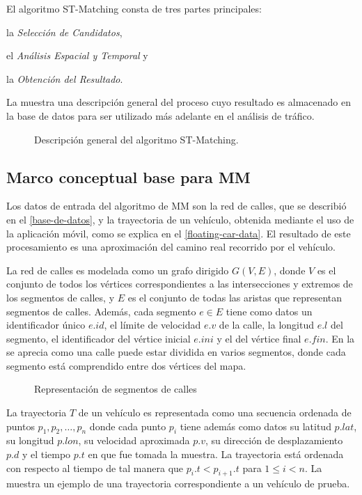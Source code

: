 El algoritmo ST-Matching consta de tres partes principales: \begin{enumerate*}[a)]
\item la \emph{Selección de Candidatos},
\item el \emph{Análisis Espacial y Temporal} y
\item la \emph{Obtención del Resultado}.
\end{enumerate*}
La  muestra una descripción general del proceso cuyo resultado es almacenado en la base de datos para ser utilizado más adelante en el análisis de tráfico.

\begin{figure}[h]
	\centering
	
	\caption[Descripción general de ST-Matching]{Descripción general del algoritmo ST-Matching.}
	\label{fig:st-matching} 
\end{figure}

\subsection{Marco conceptual base para MM}

Los datos de entrada del algoritmo de MM son la red de calles, que se describió en el \cref{base-de-datos}, y la trayectoria de un vehículo, obtenida mediante el uso de la aplicación móvil, como se explica en el \cref{floating-car-data}. El resultado de este procesamiento es una aproximación del camino real recorrido por el vehículo.

La red de calles es modelada como un grafo dirigido $G(V,E)$, donde $V$ es el conjunto de todos los vértices correspondientes a las intersecciones y extremos de los segmentos de calles, y $E$ es el conjunto de todas las aristas que representan segmentos de calles. Además, cada segmento $e \in E$ tiene como datos un identificador único $e.id$, el límite de velocidad $e.v$ de la calle, la longitud $e.l$ del segmento, el identificador del vértice inicial $e.ini$ y el del vértice final $e.fin$. En la  se aprecia como una calle puede estar dividida en varios segmentos, donde cada segmento está comprendido entre dos vértices del mapa.

\begin{figure}[h*]
	\centering
	
	\caption{\label{fig:segmentos_de_calle} Representación de segmentos de calles}	
\end{figure}

La trayectoria $T$ de un vehículo es representada como una secuencia ordenada de puntos $p_1, p_2, \dots, p_n$ donde cada punto $p_i$ tiene además como datos su latitud $p.lat$, su longitud $p.lon$, su velocidad aproximada $p.v$, su dirección de desplazamiento $p.d$ y el tiempo $p.t$ en que fue tomada la muestra. La trayectoria está ordenada con respecto al tiempo de tal manera que $p_i.t < p_{i + 1}.t$ para $1 \le i < n$. La  muestra un ejemplo de una trayectoria correspondiente a un vehículo de prueba.

